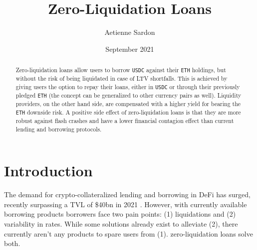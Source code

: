 \documentclass[a4paper]{article}
\title{Zero-Liquidation Loans}
\author{Aetienne Sardon}
\date{September 2021}
\begin{document}
\maketitle




\begin{abstract}
Zero-liquidation loans allow users to borrow \verb|USDC| against their \verb|ETH| holdings, but without the risk of being liquidated in case of LTV shortfalls. This is achieved by giving users the option to repay their loans, either in \verb|USDC| or through their previously pledged \verb|ETH| (the concept can be generalized to other currency pairs as well). Liquidity providers, on the other hand side, are compensated with a higher yield for bearing the \verb|ETH| downside risk. A positive side effect of zero-liquidation loans is that they are more robust against flash crashes and have a lower financial contagion effect than current lending and borrowing protocols. %
\end{abstract}

\section{Introduction}
The demand for crypto-collateralized lending and borrowing in DeFi has surged, recently surpassing a TVL of \$40bn in 2021 \cite{aave} \cite{compound}. However, with currently available borrowing products borrowers face two pain points: (1) liquidations and (2) variability in rates. While some solutions already exist to alleviate (2), there currently aren't any products to spare users from (1). zero-liquidation loans solve both.\\
\end{document}
